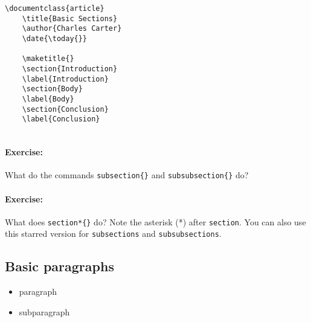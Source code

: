         \begin{verbatim}
\documentclass{article}
    \title{Basic Sections}
    \author{Charles Carter}
    \date{\today{}}
 
    \maketitle{}
    \section{Introduction}
    \label{Introduction}
    \section{Body}
    \label{Body}
    \section{Conclusion}
    \label{Conclusion}
    
        \end{verbatim}

        \paragraph{Exercise:}What do the commands \texttt{subsection\{\}} and \texttt{subsubsection\{\}} do?

        \paragraph{Exercise:}What does \texttt{section*\{\}} do? Note the asterisk (*) after \texttt{section}. You can also use this starred version for \texttt{subsections} and \texttt{subsubsections}.

        \subsection{Basic paragraphs}
        \label{Basic-paragraphs}
        
        \begin{cmd}
            \begin{itemize}
                \item{paragraph}
                \item{subparagraph}
            \end{itemize}
        \end{cmd}


